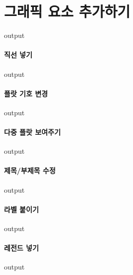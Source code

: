 \documentclass{book}
\begin{document}
\section{그래픽 요소 추가하기}
\begin{Schunk}
\begin{Soutput}
output
\end{Soutput}
\end{Schunk}
\paragraph{직선 넣기}
\begin{Schunk}
\begin{Soutput}
output
\end{Soutput}
\end{Schunk}
\paragraph{플랏 기호 변경}
\begin{Schunk}
\begin{Soutput}
output
\end{Soutput}
\end{Schunk}
\paragraph{다중 플랏 보여주기}
\begin{Schunk}
\begin{Soutput}
output
\end{Soutput}
\end{Schunk}
\paragraph{제목/부제목 수정}
\begin{Schunk}
\begin{Soutput}
output
\end{Soutput}
\end{Schunk}
\paragraph{라벨 붙이기}
\begin{Schunk}
\begin{Soutput}
output
\end{Soutput}
\end{Schunk}
\paragraph{레전드 넣기}
\begin{Schunk}
\begin{Soutput}
output
\end{Soutput}
\end{Schunk}
\end{document}
